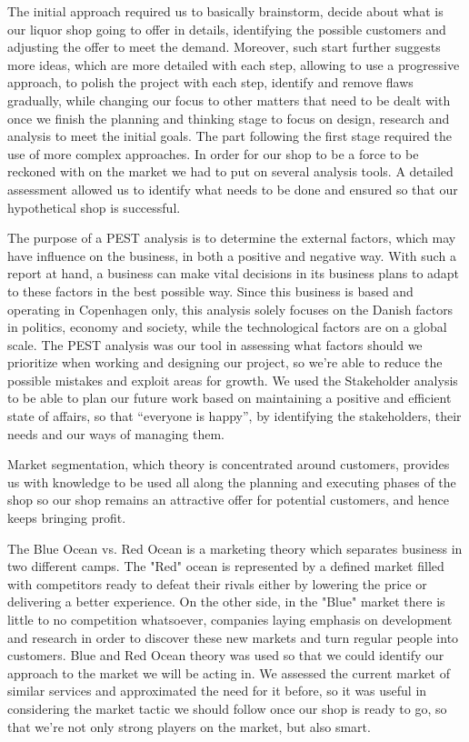 \documentclass[12p]{article}
\begin{document}
The initial approach required us to basically brainstorm, decide about what is our liquor shop going to offer in details, identifying the possible customers and adjusting the offer to meet the demand. Moreover, such start further suggests more ideas, which are more detailed with each step, allowing to use a progressive approach, to polish the project with each step, identify and remove flaws gradually, while changing our focus to other matters that need to be dealt with once we finish the planning and thinking stage to focus on design, research and analysis to meet the initial goals.
The part following the first stage required the use of more complex approaches. In order for our shop to be a force to be reckoned with on the market we had to put on several analysis tools. A detailed assessment allowed us to identify what needs to be done and ensured so that our hypothetical shop is successful. 

The purpose of a PEST analysis is to determine the external factors, which may have influence on the business, in both a positive and negative way. With such a report at hand, a business can make vital decisions in its business plans to adapt to these factors in the best possible way. Since this business is based and operating in Copenhagen only, this analysis solely focuses on the Danish factors in politics, economy and society, while the technological factors are on a global scale. The PEST analysis was our tool in assessing what factors should we prioritize when working and designing our project, so we’re able to reduce the possible mistakes and exploit areas for growth.
We used the Stakeholder analysis to be able to plan our future work based on maintaining a positive and efficient state of affairs, so that “everyone is happy”, by identifying the stakeholders, their needs and our ways of managing them. 

Market segmentation, which theory is concentrated around customers, provides us with knowledge to be used all along the planning and executing phases of the shop so our shop remains an attractive offer for potential customers, and hence keeps bringing profit. 

The Blue Ocean vs. Red Ocean is a marketing theory which separates business in two different camps. The "Red" ocean is represented by a defined market filled with competitors ready to defeat their rivals either by lowering the price or delivering a better experience. On the other side, in the "Blue" market there is little to no competition whatsoever, companies laying emphasis on development and research in order to discover these new markets and turn regular people into customers. Blue and Red Ocean theory was used so that we could identify our approach to the market we will be acting in. We assessed the current market of similar services and approximated the need for it before, so it was useful in considering the market tactic we should follow once our shop is ready to go, so that we’re not only strong players on the market, but also smart.
\end{document}
